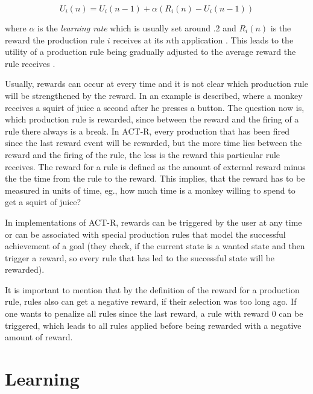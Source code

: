 \begin{equation}
U_i(n) = U_i(n - 1) + \alpha \left(R_i(n) - U_i(n - 1)\right)
\end{equation}

where $\alpha$ is the \emph{learning rate} which is usually set around .2 and $R_i(n)$ is the reward the production rule $i$ receives at its $n$th application \cite[pp. 160--161]{anderson_how_2007}. This leads to the utility of a production rule being gradually adjusted to the average reward the rule receives \cite[pp. 6--7]{actr_tutorial}. 

Usually, rewards can occur at every time and it is not clear which production rule will be strengthened by the reward. In \cite[p. 161]{anderson_how_2007} an example is described, where a monkey receives a squirt of juice a second after he presses a button. The question now is, which production rule is rewarded, since between the reward and the firing of a rule there always is a break. In ACT-R, every production that has been fired since the last reward event will be rewarded, but the more time lies between the reward and the firing of the rule, the less is the reward this particular rule receives. The reward for a rule is defined as the amount of external reward minus the the time from the rule to the reward. This implies, that the reward has to be measured in units of time, eg., how much time is a monkey willing to spend to get a squirt of juice? \cite[p. 161]{anderson_how_2007}

In implementations of ACT-R, rewards can be triggered by the user at any time or can be associated with special production rules that model the successful achievement of a goal (they check, if the current state is a wanted state and then trigger a reward, so every rule that has led to the successful state will be rewarded).

It is important to mention that by the definition of the reward for a production rule, rules also can get a negative reward, if their selection was too long ago. If one wants to penalize all rules since the last reward, a rule with reward 0 can be triggered, which leads to all rules applied before being rewarded with a negative amount of reward.




\section{Learning}

